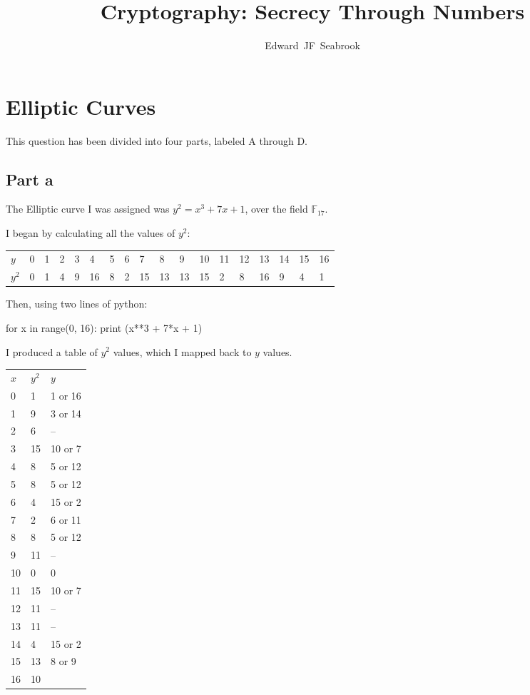 \documentclass[11pt,a4paper,twoside]{article}
\begin{document}
\title{Cryptography: Secrecy Through Numbers}
\author{Edward~JF~Seabrook}

\maketitle

\section{Elliptic Curves}
This question has been divided into four parts, labeled A through D.

\subsection{Part a}
The Elliptic curve I was assigned was $y^2 = x^3 + 7x + 1$, over the field $\mathbb{F}_{17}$. 

I began by calculating all the values of $y^2$:

\begin{table}[h]
\centering
\begin{tabular}{llllllllllllllllll}
$y$   & 0 & 1 & 2 & 3 & 4  & 5 & 6 & 7  & 8  & 9  & 10 & 11 & 12 & 13 & 14 & 15 & 16 \\
$y^2$ & 0 & 1 & 4 & 9 & 16 & 8 & 2 & 15 & 13 & 13 & 15 & 2  & 8  & 16 & 9  & 4  & 1 
\end{tabular}
\end{table}

Then, using two lines of python:

\begin{python}
for x in range(0, 16):
    print (x**3 + 7*x + 1) %
\end{python}

I produced a table of $y^2$ values, which I mapped back to $y$ values.\

\begin{table}[h]
\centering
\begin{tabular}{lll}
$x$ & $y^2$ & $y$     \\
0   & 1     & 1 or 16 \\
1   & 9     & 3 or 14 \\
2   & 6     & --      \\
3   & 15    & 10 or 7 \\
4   & 8     & 5 or 12 \\
5   & 8     & 5 or 12 \\
6   & 4     & 15 or 2 \\
7   & 2     & 6 or 11 \\
8   & 8     & 5 or 12 \\
9   & 11    & --      \\
10  & 0     & 0       \\
11  & 15    & 10 or 7 \\
12  & 11    & --      \\
13  & 11    & --      \\
14  & 4     & 15 or 2 \\
15  & 13    & 8 or 9  \\
16  & 10    &        
\end{tabular}
\end{table}
\end{document}
